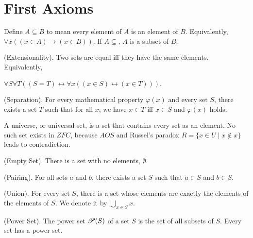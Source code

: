 \documentclass{report}
\begin{document}
\section{First Axioms} 


\begin{definition}
  Define $A \subseteq B$ to mean every element of $A$ is an element of $B$. Equivalently, $\forall x\left( \left( x \in A \right) \rightarrow \left( x \in B \right) \right)$. If $A \subseteq$, $A$ is a subset of $B$.
\end{definition}

\begin{axiom}
  {\normalfont (Extensionality).} Two sets are equal iff they have the same elements. Equivalently, 
  
 \noindent $\forall S \forall T \left( \left( S = T \right) \leftrightarrow \forall x \left( \left( x \in S \right) \leftrightarrow \left( x \in T \right) \right) \right)$.
\end{axiom}

\begin{axiom}
  {\normalfont (Separation).} For every mathematical property $\varphi(x)$ and every set $S$, there exists a set $T$ such that for all $x$, we have $x \in T$ iff $x \in S$ and $\varphi(x)$ holds.
\end{axiom}

\begin{definition}
  A universe, or universal set, is a set that contains every set as an element. No such set exists in $ZFC$, because $AOS$ and Russel's paradox $R = \{ x \in U \mid x \notin x\}$ leads to contradiction.
\end{definition}

\begin{axiom}
  {\normalfont (Empty Set).} There is a set with no elements, $\emptyset$.
\end{axiom}

\begin{axiom}
  {\normalfont (Pairing).} For all sets $a$ and $b$, there exists a set $S$ such that $a \in S$ and $b \in S$.
\end{axiom}

\begin{axiom}
  {\normalfont (Union).} For every set $S$, there is a set whose elements are exactly the elements of the elements of $S$. We denote it by $\bigcup\limits_{x \in S} x$.
\end{axiom}

\begin{axiom}
  {\normalfont (Power Set).} The power set $\mathscr{P}(S)$ of a set $S$ is the set of all subsets of $S$. Every set has a power set.
\end{axiom}
\end{document}
